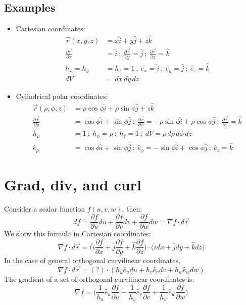 \documentclass[a4paper, 11pt, normalem]{report}
\newcommand\p{\partial}
\newcommand\vr{\vec{r}}
\begin{document}
\subsection{Examples}
\begin{itemize}
    \item Cartesian coordinates:
        \begin{align*}
            \vr(x, y, z) &= x\hat{i} + y\hat{j} + z\hat{k} \\
            \frac{\p\vr}{\p x} &= \hat{i} ~;~ \frac{\p \vr}{\p y}= \hat{j} ~;~ \frac{\p \vr}{\p z} = \hat{k} \\
            h_x = h_y &= h_z = 1 ~;~ \hat{e}_x = \hat{i} ~;~ \hat{e}_y = \hat{j} ~;~ \hat{e}_z = \hat{k} \\
            dV &= dx\,dy\,dz
        \end{align*}
    \item Cylindrical polar coordinates:
        \begin{align*}
            \vr(\rho, \phi, z) &= \rho\cos\phi \hat{i} + \rho\sin\phi \hat{j} + z\hat{k} \\
            \frac{\p\vr}{\p \rho} &= \cos\phi \hat{i} + \sin\phi \hat{j} ~;~ \frac{\p\vr}{\p \phi} = -\rho\sin\phi \hat{i} + \rho\cos\phi \hat{j} ~;~ \frac{\p\vr}{\p z} = \hat{k} \\
            h_{\rho} &= 1 ~;~ h_\phi = \rho ~;~ h_z = 1 ~;~ dV = \rho\,d\rho\,d\phi\,dz \\
            \hat{e}_\rho &= \cos\phi \hat{i} + \sin\phi\hat{j} ~;~ \hat{e}_\phi = -\sin\phi \hat{i} + \cos\phi \hat{j} ~;~
            \hat{e}_z = \hat{k}
        \end{align*}
\end{itemize}

\section{Grad, div, and curl}
Consider a scalar function $f(u, v, w)$, then:
\begin{equation}
    df = \frac{\p f}{\p u}du + \frac{\p f}{\p v}dv + \frac{\p f}{\p w}dw = \nabla f \cdot d\vr
\end{equation}
We show this formula in Cartesian coordinates:
\begin{equation*}
    \nabla f \cdot d\vr = \Big(\hat{i}\frac{\p f}{\p x} + \hat{j}\frac{\p f}{\p y} + \hat{k}\frac{\p f}{\p z}\Big)\cdot\Big(\hat{i}dx + \hat{j}dy + \hat{k}dz \Big)
\end{equation*}
In the case of general orthogonal curvilinear coordinates,
\begin{equation*}
    \nabla f \cdot d\vr = (?)\cdot(h_u \hat{e}_u du + h_v\hat{e}_v dv + h_w\hat{e}_w dw)
\end{equation*}
The gradient of a set of orthogonal curvilinear coordinates is:
\begin{equation*}
    \nabla f = \Big(\frac{1}{h_u}\hat{e}_u \frac{\p f}{\p u} + \frac{1}{h_v} \hat{e}_v \frac{\p f}{\p v} + \frac{1}{h_w}\hat{e}_w \frac{\p f}{\p w}\Big)
\end{equation*}
\end{document}
